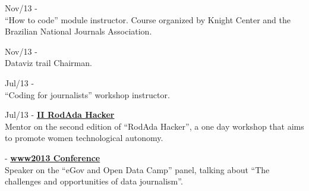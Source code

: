 \documentclass[]{friggeri-cv}
\begin{document}
{\footnotesize{Nov/13}} - \href{https://knightcenter.utexas.edu/pt-br/blog/00-14390-inscricoes-abertas-para-primeiro-curso-da-anj-com-o-centro-knight-introducao-ao-jornal}{\textbf{}}\\
           {``How to code'' module instructor. Course organized by Knight Center and the Brazilian National Journals Association}.

{\footnotesize{Nov/13}} - \href{https://web.archive.org/web/20140330181037/http://2.encontro.dados.gov.br/encontro.html}{\textbf{}}\\
           {Dataviz trail Chairman}.

{\footnotesize{Jul/13}} - \href{http://abraji.org.br/congresso/}{\textbf{}}\\
           {``Coding for journalists'' workshop instructor}.

{\footnotesize{Jul/13}} - \href{http://rodadahacker.com/}{\textbf{II RodAda Hacker}}\\
%
           {Mentor on the second edition of ``RodAda Hacker'', a one day workshop that aims to promote women technological autonomy}.

{\footnotesize{}} - \href{http://www2013.org/}{\textbf{www2013 Conference}}\\
           {Speaker on the ``eGov and Open Data Camp'' panel, talking about ``The challenges and opportunities of data journalism''}.
\end{document}
